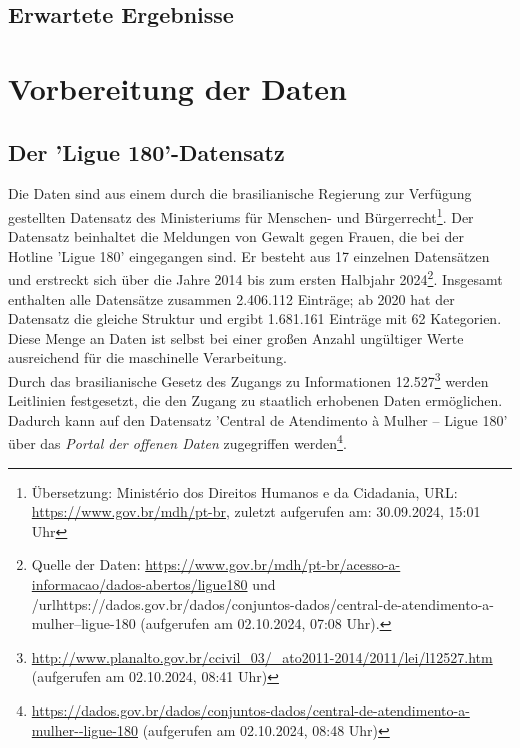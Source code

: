 \documentclass[12pt]{report}
\begin{document}
	\section{Erwartete Ergebnisse}
	\chapter{Vorbereitung der Daten}
	\section{Der 'Ligue 180'-Datensatz}
	
	Die Daten sind aus einem durch die brasilianische Regierung zur Verfügung gestellten Datensatz des Ministeriums für Menschen- und Bürgerrecht\footnote{Übersetzung: Ministério dos Direitos Humanos e da Cidadania, URL: \url{https://www.gov.br/mdh/pt-br}, zuletzt aufgerufen am: 30.09.2024, 15:01 Uhr}. Der Datensatz beinhaltet die Meldungen von Gewalt gegen Frauen,  die bei der Hotline 'Ligue 180' eingegangen sind. Er besteht aus 17 einzelnen Datensätzen und erstreckt sich über die Jahre 2014 bis zum ersten Halbjahr 2024\footnote{Quelle der Daten: \url{https://www.gov.br/mdh/pt-br/acesso-a-informacao/dados-abertos/ligue180} und /url{https://dados.gov.br/dados/conjuntos-dados/central-de-atendimento-a-mulher--ligue-180} (aufgerufen am 02.10.2024, 07:08 Uhr).}. %
	Insgesamt enthalten alle Datensätze zusammen 2.406.112 Einträge; ab 2020 hat der Datensatz die gleiche Struktur und ergibt 1.681.161 Einträge mit 62 Kategorien. Diese Menge an Daten ist selbst bei einer großen Anzahl ungültiger Werte ausreichend für die maschinelle Verarbeitung.\\
	Durch das brasilianische Gesetz des Zugangs zu Informationen 12.527\footnote{\url{http://www.planalto.gov.br/ccivil_03/_ato2011-2014/2011/lei/l12527.htm} %
	(aufgerufen am 02.10.2024, 08:41 Uhr)} werden Leitlinien festgesetzt, die den Zugang zu staatlich erhobenen Daten ermöglichen. Dadurch kann auf den Datensatz 'Central de Atendimento à Mulher – Ligue 180' über das \textit{Portal der offenen Daten} zugegriffen werden\footnote{\url{https://dados.gov.br/dados/conjuntos-dados/central-de-atendimento-a-mulher--ligue-180} (aufgerufen am 02.10.2024, 08:48 Uhr)}.
\end{document}
